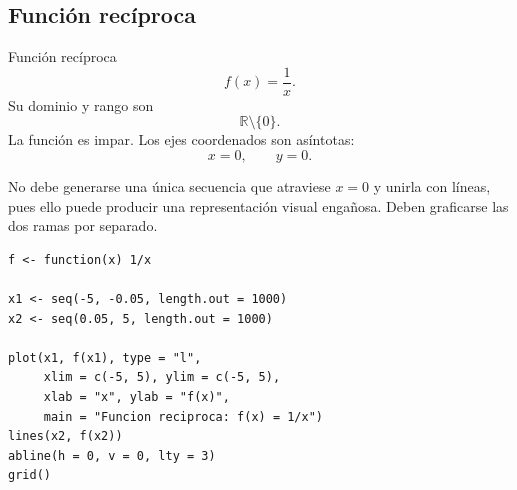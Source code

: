 \documentclass[aspectratio=169,10pt]{beamer}
\newcommand{\R}{\mathbb{R}}
\begin{document}
\subsection*{Función recíproca}
\begin{frame}{Función recíproca}
\[
f(x)=\frac{1}{x}.
\]
Su dominio y rango son
\[
\R\setminus\{0\}.
\]
La función es impar. Los ejes coordenados son asíntotas:
\[
x=0,\qquad y=0.
\]

No debe generarse una única secuencia que atraviese $x=0$ y unirla con líneas,
pues ello puede producir una representación visual engañosa. Deben graficarse
las dos ramas por separado.

\begin{center}
\end{center}

\begin{verbatim}
f <- function(x) 1/x

x1 <- seq(-5, -0.05, length.out = 1000)
x2 <- seq(0.05, 5, length.out = 1000)

plot(x1, f(x1), type = "l",
     xlim = c(-5, 5), ylim = c(-5, 5),
     xlab = "x", ylab = "f(x)",
     main = "Funcion reciproca: f(x) = 1/x")
lines(x2, f(x2))
abline(h = 0, v = 0, lty = 3)
grid()
\end{verbatim}

\end{frame}
\end{document}
